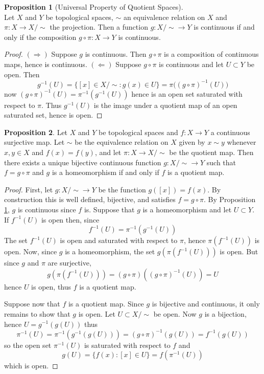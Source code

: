 \documentclass{book}
\theoremstyle{definition}
\newtheorem{proposition}{Proposition}[section]
\theoremstyle{remark}
\begin{document}
\begin{proposition}[Universal Property of Quotient Spaces]$ $\label{quotientuniversal}\\
Let $X$ and $Y$ be topological spaces, $\sim$ an equivalence relation on $X$ and $\pi:X\to X/{\sim}$ the projection. Then a function $g:X/{\sim}\to Y$ is continuous if and only if the composition $g\circ\pi:X\to Y$ is continuous.
\end{proposition}
\begin{proof}
$(\Rightarrow)$ Suppose $g$ is continuous. Then $g\circ\pi$ is a composition of continuous maps, hence is continuous. $(\Leftarrow)$ Suppose $g\circ\pi$ is continuous and let $U\subset Y$ be open. Then
$$g^{-1}(U)=\{[x]\in X/{\sim}:g(x)\in U\}=\pi\big((g\circ\pi)^{-1}(U)\big)$$
now $(g\circ\pi)^{-1}(U)=\pi^{-1}(g^{-1}(U))$ hence is an open set saturated with respect to $\pi$. Thus $g^{-1}(U)$ is the image under a quotient map of an open saturated set, hence is open.
\end{proof}

\begin{proposition}
Let $X$ and $Y$ be topological spaces and $f:X\to Y$ a continuous surjective map. Let $\sim$ be the equivalence relation on $X$ given by $x\sim y$ whenever $x,y\in X$ and $f(x)=f(y)$, and let $\pi:X\to X/{\sim}$ be the quotient map. Then there exists a unique bijective continuous function $g:X/{\sim}\to Y$ such that $f=g\circ\pi$ and $g$ is a homeomorphism if and only if $f$ is a quotient map.
\end{proposition}
\begin{proof} First, let $g:X/{\sim}\to Y$ be the function $g([x])=f(x)$. By construction this is well defined, bijective, and satisfies $f=g\circ\pi$. By Proposition \ref{quotientuniversal}, $g$ is continuous since $f$ is.
Suppose that $g$ is a homeomorphism and let $U\subset Y$. If $f^{-1}(U)$ is open then, since
$$f^{-1}(U)=\pi^{-1}(g^{-1}(U))$$
The set $f^{-1}(U)$ is open and saturated with respect to $\pi$, hence $\pi(f^{-1}(U))$ is open. Now, since $g$ is a homeomorphism, the set $g(\pi(f^{-1}(U)))$ is open. But since $g$ and $\pi$ are surjective,
$$g(\pi(f^{-1}(U)))=(g\circ\pi)((g\circ\pi)^{-1}(U))=U$$
hence $U$ is open, thus $f$ is a quotient map.\par
Suppose now that $f$ is a quotient map. Since $g$ is bijective and continuous, it only remains to show that $g$ is open. Let $U\subset X/{\sim}$ be open. Now $g$ is a bijection, hence $U=g^{-1}(g(U))$ thus $$\pi^{-1}(U)=\pi^{-1}(g^{-1}(g(U)))=(g\circ\pi)^{-1}(g(U))=f^{-1}(g(U))$$
so the open set $\pi^{-1}(U)$ is saturated with respect to $f$ and
$$g(U)=\{f(x):[x]\in U\}=f(\pi^{-1}(U))$$
which is open.
\end{proof}
\end{document}
